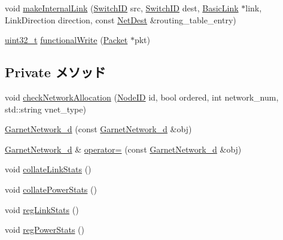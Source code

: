 \begin{DoxyCompactItemize}
\item 
void \hyperlink{classGarnetNetwork__d_a035f37231d3a7edcadd92b7d9e17d4e4}{makeInternalLink} (\hyperlink{TypeDefines_8hh_ac925a332c83eaf1e40e056e7a20ebcd8}{SwitchID} src, \hyperlink{TypeDefines_8hh_ac925a332c83eaf1e40e056e7a20ebcd8}{SwitchID} dest, \hyperlink{classBasicLink}{BasicLink} $\ast$link, LinkDirection direction, const \hyperlink{classNetDest}{NetDest} \&routing\_\-table\_\-entry)
\item 
\hyperlink{Type_8hh_a435d1572bf3f880d55459d9805097f62}{uint32\_\-t} \hyperlink{classGarnetNetwork__d_ad07b9def1d6f5e5f988a254c3a9d1ad9}{functionalWrite} (\hyperlink{classPacket}{Packet} $\ast$pkt)
\end{DoxyCompactItemize}
\subsection*{Private メソッド}
\begin{DoxyCompactItemize}
\item 
void \hyperlink{classGarnetNetwork__d_ad98444c4b69e4656dd10dc4ea3ad80dd}{checkNetworkAllocation} (\hyperlink{TypeDefines_8hh_a83c14b4ae37e80071f6b3506a6c46151}{NodeID} id, bool ordered, int network\_\-num, std::string vnet\_\-type)
\item 
\hyperlink{classGarnetNetwork__d_a4a6b33729b27f5aaeb2ec88768c33339}{GarnetNetwork\_\-d} (const \hyperlink{classGarnetNetwork__d_1_1GarnetNetwork__d}{GarnetNetwork\_\-d} \&obj)
\item 
\hyperlink{classGarnetNetwork__d_1_1GarnetNetwork__d}{GarnetNetwork\_\-d} \& \hyperlink{classGarnetNetwork__d_a1192f4f0aec8b0108dfb92ae40bc11a2}{operator=} (const \hyperlink{classGarnetNetwork__d_1_1GarnetNetwork__d}{GarnetNetwork\_\-d} \&obj)
\item 
void \hyperlink{classGarnetNetwork__d_a0a24c83319631e21d9b9721762c8c6d4}{collateLinkStats} ()
\item 
void \hyperlink{classGarnetNetwork__d_a35d51fcf68be8835a47c32ebd1a99182}{collatePowerStats} ()
\item 
void \hyperlink{classGarnetNetwork__d_a3fcf827957b65768909aa68853debf50}{regLinkStats} ()
\item 
void \hyperlink{classGarnetNetwork__d_acd2f94805e8913b3d4238a57c39b320c}{regPowerStats} ()
\end{DoxyCompactItemize}
